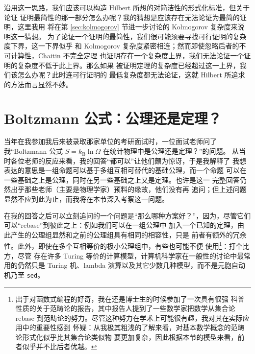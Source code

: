 沿用这一思路，我们应该可以构造 Hilbert 所想的对简洁性的形式化标准，但关于论证
证明最简性的那一部分怎么办呢？我的猜想是应该存在无法论证为最简的证明，这里我用
将在第 \ref{sec:kolmogorov} 节进一步讨论的 Kolmogorov 复杂度来说明这一猜想。
为了论证一个证明的最简性，我们很可能须要寻找可行证明的复杂度下界，这一下界似乎
和 Kolmogorov 复杂度紧密相连；然而即使忽略后者的不可计算性，Chaitin 不完全定理
也证明存在一个复杂度上界，我们无法论证一个证明的复杂度不低于此上界。那么如果
被证明定理的复杂度已经超过这一上界，我们该怎么办呢？此时连可行证明的
最低复杂度都无法论证，这就 Hilbert 所追求的方法而言显然不妙。

\section{Boltzmann 公式：公理还是定理？}\label{sec:boltzmann}

当年在我参加我后来被录取那家单位的考研面试时，一位面试老师问了我“Boltzmann
公式 $S = k_\mathrm{B} \ln\varOmega$ 在统计物理中是公理还是定理？”的问题。
从当时各位老师的反应来看，我的回答“都可以”让他们颇为惊讶，于是我解释了
我想表达的意思是一组命题可以基于多组互相可替代的基础公理，而一个命题
可以在一些基础之上是公理，同时在另一些基础之上又是定理。也许是这一
完整回答仍然出乎那些老师（主要是物理学家）预料的缘故，他们没有再
追问；但上述问题显然不应到此为止，而我将在本节深入考察这一问题。

在我的回答之后可以立刻追问的一个问题是“那么哪种方案好？”，因为，尽管它们可以“rebase”到彼此之上：例如我们可以在一组公理中
加入一个已知的定理，由此产生的公理组显然和之前的公理组具有相同的相容性，只是
前者有额外的冗余性。此外，即使在多个互相等价的极小公理组中，有些也可能不便
使用\footnote{出于对函数式编程的好奇，我在还是博士生的时候参加了一次具有很强
科普性质的关于范畴论的报告，其中报告人提到了一些数学家把数学从集合论 rebase
到范畴论的努力。尽管这种努力在学术上可能很有趣，我对其在实际应用中的重要性感到
怀疑：从我极其粗浅的了解来看，对基本数学概念的范畴论形式化似乎比其集合论类似物
要更加复杂，因此根据本节的模型来看，前者似乎并不比后者优越。}：打个比方，尽管
存在许多 Turing 等价的计算模型，计算机科学家在一般性的讨论中最常用的仍然只是
Turing 机、lambda 演算以及其它少数几种模型，而不是元胞自动机乃至 \verb|sed|。

